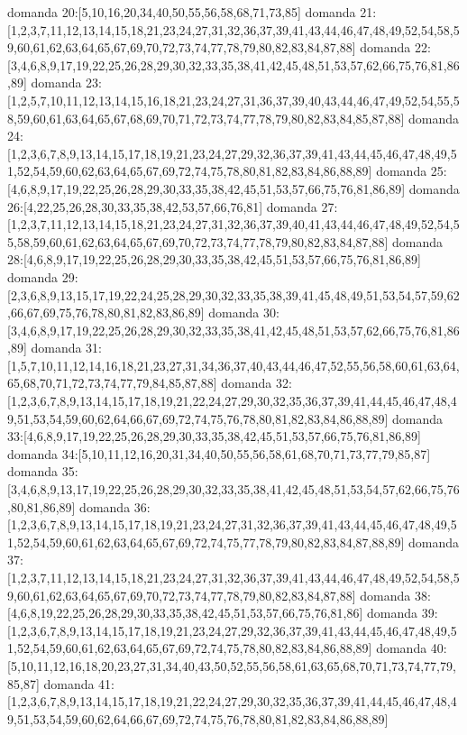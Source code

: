 domanda 20:[5,10,16,20,34,40,50,55,56,58,68,71,73,85]
domanda 21:[1,2,3,7,11,12,13,14,15,18,21,23,24,27,31,32,36,37,39,41,43,44,46,47,48,49,52,54,58,59,60,61,62,63,64,65,67,69,70,72,73,74,77,78,79,80,82,83,84,87,88]
domanda 22:[3,4,6,8,9,17,19,22,25,26,28,29,30,32,33,35,38,41,42,45,48,51,53,57,62,66,75,76,81,86,89]
domanda 23:[1,2,5,7,10,11,12,13,14,15,16,18,21,23,24,27,31,36,37,39,40,43,44,46,47,49,52,54,55,58,59,60,61,63,64,65,67,68,69,70,71,72,73,74,77,78,79,80,82,83,84,85,87,88]
domanda 24:[1,2,3,6,7,8,9,13,14,15,17,18,19,21,23,24,27,29,32,36,37,39,41,43,44,45,46,47,48,49,51,52,54,59,60,62,63,64,65,67,69,72,74,75,78,80,81,82,83,84,86,88,89]
domanda 25:[4,6,8,9,17,19,22,25,26,28,29,30,33,35,38,42,45,51,53,57,66,75,76,81,86,89]
domanda 26:[4,22,25,26,28,30,33,35,38,42,53,57,66,76,81]
domanda 27:[1,2,3,7,11,12,13,14,15,18,21,23,24,27,31,32,36,37,39,40,41,43,44,46,47,48,49,52,54,55,58,59,60,61,62,63,64,65,67,69,70,72,73,74,77,78,79,80,82,83,84,87,88]
domanda 28:[4,6,8,9,17,19,22,25,26,28,29,30,33,35,38,42,45,51,53,57,66,75,76,81,86,89]
domanda 29:[2,3,6,8,9,13,15,17,19,22,24,25,28,29,30,32,33,35,38,39,41,45,48,49,51,53,54,57,59,62,66,67,69,75,76,78,80,81,82,83,86,89]
domanda 30:[3,4,6,8,9,17,19,22,25,26,28,29,30,32,33,35,38,41,42,45,48,51,53,57,62,66,75,76,81,86,89]
domanda 31:[1,5,7,10,11,12,14,16,18,21,23,27,31,34,36,37,40,43,44,46,47,52,55,56,58,60,61,63,64,65,68,70,71,72,73,74,77,79,84,85,87,88]
domanda 32:[1,2,3,6,7,8,9,13,14,15,17,18,19,21,22,24,27,29,30,32,35,36,37,39,41,44,45,46,47,48,49,51,53,54,59,60,62,64,66,67,69,72,74,75,76,78,80,81,82,83,84,86,88,89]
domanda 33:[4,6,8,9,17,19,22,25,26,28,29,30,33,35,38,42,45,51,53,57,66,75,76,81,86,89]
domanda 34:[5,10,11,12,16,20,31,34,40,50,55,56,58,61,68,70,71,73,77,79,85,87]
domanda 35:[3,4,6,8,9,13,17,19,22,25,26,28,29,30,32,33,35,38,41,42,45,48,51,53,54,57,62,66,75,76,80,81,86,89]
domanda 36:[1,2,3,6,7,8,9,13,14,15,17,18,19,21,23,24,27,31,32,36,37,39,41,43,44,45,46,47,48,49,51,52,54,59,60,61,62,63,64,65,67,69,72,74,75,77,78,79,80,82,83,84,87,88,89]
domanda 37:[1,2,3,7,11,12,13,14,15,18,21,23,24,27,31,32,36,37,39,41,43,44,46,47,48,49,52,54,58,59,60,61,62,63,64,65,67,69,70,72,73,74,77,78,79,80,82,83,84,87,88]
domanda 38:[4,6,8,19,22,25,26,28,29,30,33,35,38,42,45,51,53,57,66,75,76,81,86]
domanda 39:[1,2,3,6,7,8,9,13,14,15,17,18,19,21,23,24,27,29,32,36,37,39,41,43,44,45,46,47,48,49,51,52,54,59,60,61,62,63,64,65,67,69,72,74,75,78,80,82,83,84,86,88,89]
domanda 40:[5,10,11,12,16,18,20,23,27,31,34,40,43,50,52,55,56,58,61,63,65,68,70,71,73,74,77,79,85,87]
domanda 41:[1,2,3,6,7,8,9,13,14,15,17,18,19,21,22,24,27,29,30,32,35,36,37,39,41,44,45,46,47,48,49,51,53,54,59,60,62,64,66,67,69,72,74,75,76,78,80,81,82,83,84,86,88,89]

